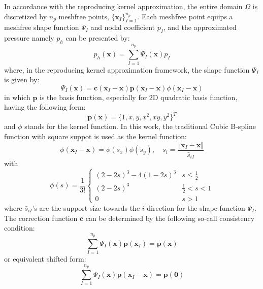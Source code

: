 In accordance with the reproducing kernel approximation, the entire domain $\Omega$ is discretized by $n_p$ meshfree points, $\{\boldsymbol x_I\}_{I=1}^{n_p}$. Each meshfree point equips a meshfree shape function $\Psi_I$ and nodal coefficient $p_I$, and the approximated pressure namely $p_h$ can be presented by:
\begin{equation}
p_h(\boldsymbol x) = \sum_{I=1}^{n_p} \Psi_I(\boldsymbol x) p_I
\end{equation}
where, in the reproducing kernel approximation framework, the shape function $\Psi_I$ is given by:
\begin{equation}\label{rkshape}
\Psi_I(\boldsymbol x) = \boldsymbol c(\boldsymbol x_I-\boldsymbol x) \boldsymbol p(\boldsymbol x_I-\boldsymbol x) \phi(\boldsymbol x_I - \boldsymbol x)
\end{equation}
in which $\boldsymbol p$ is the basis function, especially for 2D quadratic basis function, having the following form: 
\begin{equation}
\boldsymbol p(\boldsymbol x) = \{ 1, x, y, x^2, xy, y^2\}^T
\end{equation}
and $\phi$ stands for the kernel function. In this work, the traditional Cubic B-spline function with square suppot is used as the kernel function:
\begin{equation}
\phi(\boldsymbol x_I-\boldsymbol x) = \phi(s_x) \phi(s_y), \quad s_i = \frac{\Vert \boldsymbol x_I - \boldsymbol x\Vert}{\bar s_{iI}}
\end{equation}
with
\begin{equation}
\phi(s) =\frac{1}{3!} \begin{cases}
    (2-2s)^3 - 4(1-2s)^3 & s\le\frac{1}{2} \\
    (2-2s)^3 &\frac{1}{2}<s<1 \\
    0 & s> 1
\end{cases}
\end{equation}
where $\bar s_{iI}$'s are the support size towards the $i$-direction for the shape function $\Psi_I$.
The correction function $\boldsymbol c$ can be determined by the following so-call consistency condition:
\begin{equation}\label{cc1}
\sum_{I=1}^{n_p}\Psi_I(\boldsymbol x) \boldsymbol p(\boldsymbol x_I) = \boldsymbol p (\boldsymbol x)
\end{equation}
or equivalent shifted form:
\begin{equation}\label{cc2}
\sum_{I=1}^{n_p}\Psi_I(\boldsymbol x) \boldsymbol p(\boldsymbol x_I-\boldsymbol x) = \boldsymbol p (\boldsymbol 0)
\end{equation}

